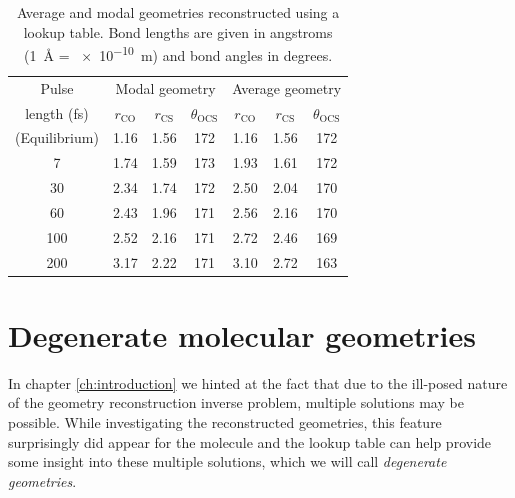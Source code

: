\begin{table}
  \myfloatalign
  \centering
  \begin{tabularx}{0.9\textwidth}{ccccccc}
    \toprule
    Pulse & \multicolumn{3}{c}{Modal geometry} & \multicolumn{3}{c}{Average geometry} \\
    length (fs) & $r_\mathrm{CO}$ & $r_\mathrm{CS}$ & $\theta_\mathrm{OCS}$ & $r_\mathrm{CO}$ & $r_\mathrm{CS}$ & $\theta_\mathrm{OCS}$ \\
    \midrule
    (Equilibrium) & 1.16 & 1.56 & 172 & 1.16 & 1.56 & 172 \\
    7 & 1.74 & 1.59 & 173 & 1.93 & 1.61 & 172 \\
    30 & 2.34 & 1.74 & 172 & 2.50 & 2.04 & 170 \\
    60 & 2.43 & 1.96 & 171 & 2.56 & 2.16 & 170 \\
    100 & 2.52 & 2.16 & 171 & 2.72 & 2.46 & 169 \\
    200 & 3.17 & 2.22 & 171 & 3.10 & 2.72 & 163 \\
    \bottomrule
  \end{tabularx}
  \caption[Average and modal geometries reconstructed using a lookup table.]
  {Average and modal geometries reconstructed using a lookup table. Bond lengths are given in angstroms (\SI{1}{\angstrom} = \SI{e-10}{\m}) and bond angles in degrees.}
  \label{table:lookupTableGeometries}
\end{table}


\section{Degenerate molecular geometries} \label{sec:degenerateGeometries}
In chapter \ref{ch:introduction} we hinted at the fact that due to the ill-posed nature of the geometry reconstruction inverse problem, multiple solutions may be possible. While investigating the reconstructed geometries, this feature surprisingly did appear for the  molecule and the lookup table can help provide some insight into these multiple solutions, which we will call \emph{degenerate geometries}.

